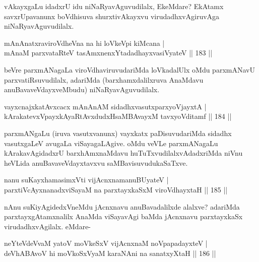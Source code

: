 \begin{artha}
vAkayxgaLu idadxrU idu niNaRyavAguvudilalx, EkeMdare? EkAtamx savxrUpavanunx boVdhisuva shurxtivAkayxvu virudadhxvAgiruvAga niNaRyavAguvudilalx.
\end{artha}

\begin{shl}
mAnAnatxraviroVdheVna na hi loVkeV\s pi kiMcana |\\
mAnaM parxvataRteV tasAmxnenxYtadadhayxvasiVyateV \hfill || 183 ||
\end{shl}

\begin{artha}
beVre parxmANagaLa viroVdhaviruvudariMda loVkadalUlx oMdu parxmANavU parxvatiRsuvudilalx, adariMda (barxhamxdalilxruva AnaMdavu anuBavaveVdayxveMbudu) niNaRyavAguvudilalx. 
\end{artha}

\begin{shl}
vayxcnajxkatAvxcacx mAnAnAM sidadhxvasutxparxyoVjayxtA |\\
kArakatevxV\s payxkAyaRtAvxdudxHsaMBAvayxM tavxyoVditamf \hfill || 184 ||
\end{shl}

\begin{artha}%
parxmANgaLu (iruva vasutxvanunx) vayxkatx paDisuvudariMda sidadhx vasutxgaLeV avugaLa viSayagaLAgive. oMdu veVLe parxmANagaLu kArakavAgidadxrU barxhAmxnaMdavu huTuTxvudilalxvAdadxriMda niVnu heVLida anuBavaveVdayxtavxvu saMBavisuvudukaSaTxve.
\end{artha}


\begin{shl}
nanu suKayxhamasimxVti vijAcnxnamanuBUyateV |\\
parxtiVcAyxnanadxviSayaM na parxtayxkaSxM viroVdhayxtaH \hfill || 185 ||
\end{shl}

\begin{artha}
nAnu suKiyAgidedxVneMdu jAcnxnavu anuBavadalilxde alalxve? adariMda parxtayxgAtamxnalilx AnaMda viSayavAgi baMda jAcnxnavu parxtayxkaSx virudadhxvAgilalx. eMdare-
\end{artha}


\begin{shl}
neYteVdeVvaM yatoV moVkeSxV vijAcnxnaM noVpapadayxteV |\\
deVhABAvoV hi moVkoSxV\s yaM karaNAni na sanatxyXtaH \hfill || 186 ||
\end{shl}

